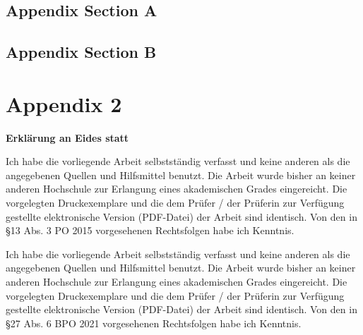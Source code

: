 \documentclass[11pt,a4paper,english,notitlepage]{report}
\begin{document}
\section{Appendix Section A}
\label{sec:appendix_1}

\section{Appendix Section B}
\label{sec:appendix_2}


\chapter{Appendix 2}
\label{chap:appendix_2}

\clearpage

{}



\clearpage

%
%
%

\thispagestyle{empty}
\label{erklaerung}

\setlength{\parindent}{0em}

\textbf{\large{Erklärung an Eides statt}}

 \vspace*{65pt}
 

Ich habe die vorliegende Arbeit selbstständig verfasst und keine anderen als die angegebenen Quellen und Hilfsmittel benutzt. Die Arbeit wurde bisher an keiner anderen Hochschule zur Erlangung eines akademischen Grades eingereicht. Die vorgelegten Druckexemplare und die dem Prüfer / der Prüferin zur Verfügung gestellte elektronische Version (PDF-Datei) der Arbeit sind identisch. Von den in §13 Abs. 3 PO 2015 vorgesehenen Rechtsfolgen habe ich Kenntnis.

Ich habe die vorliegende Arbeit selbstständig verfasst und keine anderen als die angegebenen Quellen und Hilfsmittel benutzt. Die Arbeit wurde bisher an keiner anderen Hochschule zur Erlangung eines akademischen Grades eingereicht. Die vorgelegten Druckexemplare und die dem Prüfer / der Prüferin zur Verfügung gestellte elektronische Version (PDF-Datei) der Arbeit sind identisch. Von den in §27 Abs. 6 BPO 2021 vorgesehenen Rechtsfolgen habe ich Kenntnis.
\end{document}
